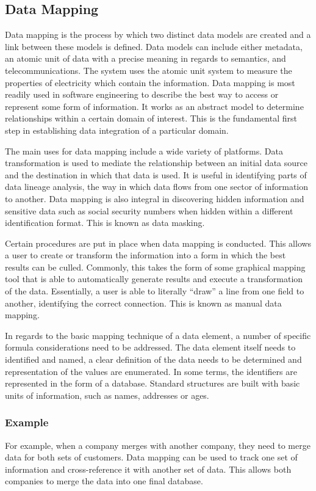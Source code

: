 \documentclass[12pt]{article}
\begin{document}
\subsection{Data Mapping}
Data mapping is the process by which two distinct data models are created and a link between these models is defined. Data models can include either metadata, an atomic unit of data with a precise meaning in regards to semantics, and telecommunications. The system uses the atomic unit system to measure the properties of electricity which contain the information. Data mapping is most readily used in software engineering to describe the best way to access or represent some form of information. It works as an abstract model to determine relationships within a certain domain of interest. This is the fundamental first step in establishing data integration of a particular domain.

The main uses for data mapping include a wide variety of platforms. Data transformation is used to mediate the relationship between an initial data source and the destination in which that data is used. It is useful in identifying parts of data lineage analysis, the way in which data flows from one sector of information to another. Data mapping is also integral in discovering hidden information and sensitive data such as social security numbers when hidden within a different identification format. This is known as data masking.

Certain procedures are put in place when data mapping is conducted. This allows a user to create or transform the information into a form in which the best results can be culled. Commonly, this takes the form of some graphical mapping tool that is able to automatically generate results and execute a transformation of the data. Essentially, a user is able to literally “draw” a line from one field to another, identifying the correct connection. This is known as manual data mapping.

In regards to the basic mapping technique of a data element, a number of specific formula considerations need to be addressed. The data element itself needs to identified and named, a clear definition of the data needs to be determined and representation of the values are enumerated. In some terms, the identifiers are represented in the form of a database. Standard structures are built with basic units of information, such as names, addresses or ages.
\subsubsection{Example}
For example, when a company merges with another company, they need to merge data for both sets of customers. Data mapping can be used to track one set of information and cross-reference it with another set of data. This allows both companies to merge the data into one final database.
\end{document}
